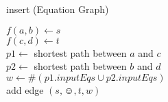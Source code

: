 \begin{algorithm}[h]
\caption[.]{insert (Equation Graph)}
	
	{
		$f(a,b) \leftarrow s$ \\
		$f(c,d) \leftarrow t$ \\
		$p1 \leftarrow $ shortest path between $a$ and $c$ \\%
		$p2 \leftarrow $ shortest path between $b$ and $d$ \\%
		$w \leftarrow \#(p1.inputEqs \cup p2.inputEqs) $ \\
		add edge $(s,\smiley,t,w)$ %
	}
  
  \label{algo:insert_dij}
\end{algorithm}
